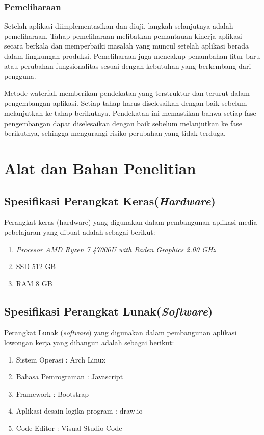\subsubsection{Pemeliharaan}

    Setelah aplikasi diimplementasikan dan diuji, langkah selanjutnya adalah pemeliharaan. Tahap pemeliharaan melibatkan pemantauan kinerja aplikasi secara berkala dan memperbaiki masalah yang muncul setelah aplikasi berada dalam lingkungan produksi. Pemeliharaan juga mencakup penambahan fitur baru atau perubahan fungsionalitas sesuai dengan kebutuhan yang berkembang dari pengguna.

Metode waterfall memberikan pendekatan yang terstruktur dan terurut dalam pengembangan aplikasi. Setiap tahap harus diselesaikan dengan baik sebelum melanjutkan ke tahap berikutnya. Pendekatan ini memastikan bahwa setiap fase pengembangan dapat diselesaikan dengan baik sebelum melanjutkan ke fase berikutnya, sehingga mengurangi risiko perubahan yang tidak terduga.

\section{Alat dan Bahan Penelitian}
\subsection{Spesifikasi Perangkat Keras(\textit{Hardware})}
    Perangkat keras (hardware) yang digunakan dalam pembangunan aplikasi media pebelajaran yang dibuat adalah sebagai berikut:
\begin{enumerate}
    \item \textit{Procesor AMD Ryzen 7 47000U with Raden Graphics 2.00 GHz}
    \item SSD 512 GB
    \item RAM 8 GB
\end{enumerate}

\subsection{Spesifikasi Perangkat Lunak(\textit{Software})}
    Perangkat Lunak (\textit{software}) yang digunakan dalam pembangunan aplikasi lowongan kerja yang dibangun adalah sebagai berikut:

\begin{enumerate}
    \item Sistem Operasi : Arch Linux
    \item Bahasa Pemrograman : Javascript
    \item Framework : Bootstrap
    \item Aplikasi desain logika program : draw.io
    \item Code Editor : Visual Studio Code
\end{enumerate}

